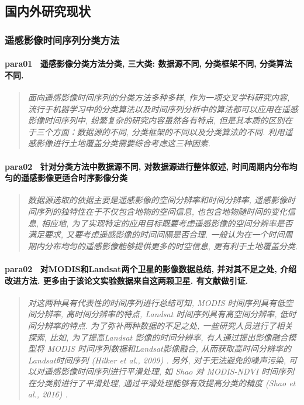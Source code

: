 \subsection{国内外研究现状}
\subsubsection{遥感影像时间序列分类方法}

\paragraph*{para01~
    \textcolor[RGB]{17, 205, 29}{遥感影像分类方法分类, 三大类: 数据源不同, 分类框架不同, 分类算法不同.}}
\begin{quotation}
    \itshape
    面向遥感影像时间序列的分类方法多种多样, 作为一项交叉学科研究内容, 流行于机器学习中的分类算法以及时间序列分析中的算法都可以应用在遥感影像时间序列中, 纷繁复杂的研究内容虽然各有特点, 但是其本质的区别在于三个方面：数据源的不同, 分类框架的不同以及分类算法的不同. 利用遥感影像进行土地覆盖分类需要综合考虑这三种因素. 
\end{quotation}

\paragraph*{para02~
    \textcolor[RGB]{17, 205, 29}{针对分类方法中数据源不同,  对数据源进行整体叙述, 时间周期内分布均匀的遥感影像更适合时序影像分类}}
\begin{quotation}
    \itshape
    数据源选取的依据主要是遥感影像的空间分辨率和时间分辨率, 遥感影像时间序列的独特性在于不仅包含地物的空间信息, 也包含地物随时间的变化信息, 相应地, 为了实现特定的应用目标既要考虑遥感影像的空间分辨率是否满足要求, 又要考虑遥感影像的时间间隔是否合理. 一般认为在一个时间周期内分布均匀的遥感影像能够提供更多的时空信息, 更有利于土地覆盖分类.
\end{quotation}

\paragraph*{para02~
    \textcolor[RGB]{17, 205, 29}{对MODIS和Landsat两个卫星的影像数据总结, 并对其不足之处, 介绍改进方法. 更多由于该论文实验数据来自这两颗卫星. 有文献做引证.}}
\begin{quotation}
    \itshape 
    对这两种具有代表性的时间序列进行总结可知, MODIS 时间序列具有低空间分辨率, 高时间分辨率的特点, Landsat 时间序列具有高空间分辨率, 低时间分辨率的特点. 为了弥补两种数据的不足之处, 一些研究人员进行了相关探索, 比如, 为了提高Landsat 影像的时间分辨率, 有人通过提出影像融合模型将 MODIS 时间序列数据和Landsat影像融合, 从而获取高时间分辨率的Landsat时间序列 (Hilker et al.,  2009) . 另外, 对于无法避免的噪声污染, 可以对遥感影像时间序列进行平滑处理, 如 Shao 对 MODIS-NDVI 时间序列在分类前进行了平滑处理, 通过平滑处理能够有效提高分类的精度 (Shao et al., 2016) .  
\end{quotation}

